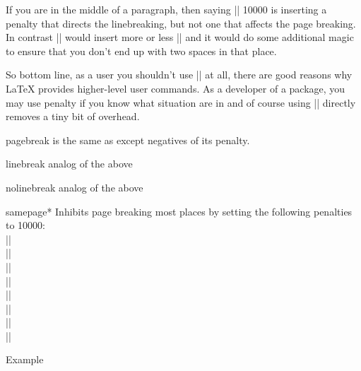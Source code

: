 If you are in the middle of a paragraph, then saying |\penalty| 10000 is inserting a penalty that directs the linebreaking, but not one that affects the page breaking. In contrast |\nopagebreak| would insert more or less || and it would do some additional magic to ensure that you don't end up with two spaces in that place.

So bottom line, as a user you shouldn't use |\penalty| at all, there are good reasons why LaTeX provides higher-level user commands. As a developer of a package, you may use penalty if you know what situation are in and of course using |\penalty| directly removes a tiny bit of overhead.



 \begin{docCommand*}{pagebreak}{}  
       is the same as  except negatives of its penalty.
 \end{docCommand*}
 
 \begin{docCommand*}{linebreak}{}
  analog of the above
 \end{docCommand*} 

 \begin{docCommand*}{nolinebreak}{}
  analog of the above
 \end{docCommand*} 

\begin{docCommand*}{samepage*}{}
 Inhibits page breaking most places by setting the 
 following penalties to 10000:\\
                    |\interlinepenalty|\\
                    |\postdisplaypenalty|\\
                    |\interdisplaylinepenalty|\\
                    |\@beginparpenalty|\\
                    |\@endparpenalty|\\
                    |\@itempenalty|\\
                    |\@secpenalty|\\
                    |\interfootnotelinepenalty|
\end{docCommand*}

\begin{texexample}{Example}{}
\bgroup
\samepage

\the\interlinepenalty

\the\postdisplaypenalty

\the\interfootnotelinepenalty
\egroup

\the\interlinepenalty
\end{texexample}


